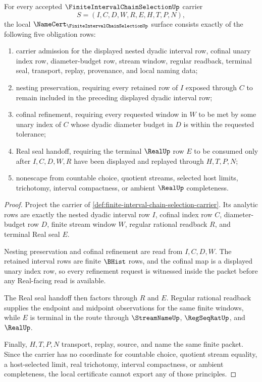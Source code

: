\begin{theorem}
\label{thm:finite-interval-chain-selection-namecert-obligations}
For every accepted $\FiniteIntervalChainSelectionUp$ carrier
$$
S=(I,C,D,W,R,E,H,T,P,N),
$$
the local $\NameCert_{\FiniteIntervalChainSelectionUp}$ surface consists exactly of the following five obligation rows:
\begin{enumerate}
\item carrier admission for the displayed nested dyadic interval row, cofinal unary index row, diameter-budget row, stream window, regular readback, terminal seal, transport, replay, provenance, and local naming data;
\item nesting preservation, requiring every retained row of $I$ exposed through $C$ to remain included in the preceding displayed dyadic interval row;
\item cofinal refinement, requiring every requested window in $W$ to be met by some unary index of $C$ whose dyadic diameter budget in $D$ is within the requested tolerance;
\item Real seal handoff, requiring the terminal $\RealUp$ row $E$ to be consumed only after $I,C,D,W,R$ have been displayed and replayed through $H,T,P,N$;
\item nonescape from countable choice, quotient streams, selected host limits, trichotomy, interval compactness, or ambient $\RealUp$ completeness.
\end{enumerate}
\end{theorem}
\begin{proof}
Project the carrier of \autoref{def:finite-interval-chain-selection-carrier}. Its analytic rows are exactly the nested dyadic interval row $I$, cofinal index row $C$, diameter-budget row $D$, finite stream window $W$, regular rational readback $R$, and terminal Real seal $E$.

Nesting preservation and cofinal refinement are read from $I,C,D,W$. The retained interval rows are finite $\BHist$ rows, and the cofinal map is a displayed unary index row, so every refinement request is witnessed inside the packet before any Real-facing read is available.

The Real seal handoff then factors through $R$ and $E$. Regular rational readback supplies the endpoint and midpoint observations for the same finite windows, while $E$ is terminal in the route through $\StreamNameUp$, $\RegSeqRatUp$, and $\RealUp$.

Finally, $H,T,P,N$ transport, replay, source, and name the same finite packet. Since the carrier has no coordinate for countable choice, quotient stream equality, a host-selected limit, real trichotomy, interval compactness, or ambient completeness, the local certificate cannot export any of those principles.
\end{proof}


